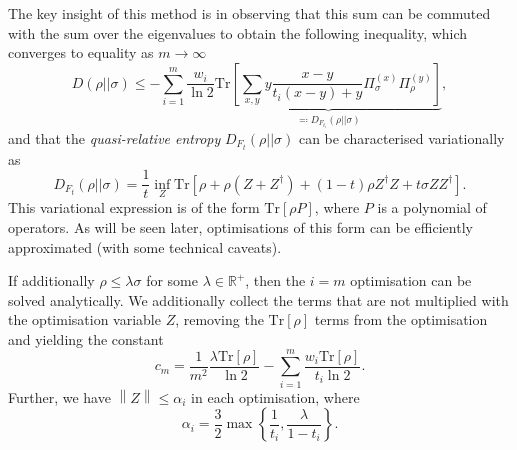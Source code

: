 \documentclass[10pt, a4paper]{article}
\numberwithin{equation}{section} %
\theoremstyle{definition}
\theoremstyle{plain}
\newcommand{\norm}[1]{\left\lVert#1\right\rVert}
\newcommand{\?}{\mathrel{?}} %
\newcommand{\R}{\mathbb{R}} %
\newcommand{\Tr}{\mathrm{Tr}} %
\begin{document}
      The key insight of this method is in observing that this sum can be commuted with the sum over the eigenvalues to obtain the following inequality, which converges to equality as \(m\to\infty\)
      \begin{equation}
        D(\rho||\sigma) \leq - \sum_{i=1}^{m} \frac{w_i}{\ln 2} \underbrace{\Tr\left[ \sum_{x,y} y \frac{x-y}{t_i(x-y)+y} \Pi^{(x)}_{\sigma} \Pi^{(y)}_{\rho} \right]}_{\eqqcolon D_{F_{t_i}}(\rho||\sigma)},\label{eqn:re_from_qre}
      \end{equation}
      and that the \emph{quasi-relative entropy} \(D_{F_{t}}(\rho||\sigma)\) can be characterised variationally as
      \begin{equation}
        D_{F_{t}}(\rho||\sigma) = \frac{1}{t} \inf_Z \Tr\left[ \rho + \rho(Z + Z^{\dagger}) + (1-t)\rho{}Z^{\dagger}Z + t\sigma{}ZZ^{\dagger} \right].\label{eqn:qre_var}
      \end{equation}
      This variational expression is of the form \(\Tr[\rho P]\), where \(P\) is a polynomial of operators. As will be seen later, optimisations of this form can be efficiently approximated (with some technical caveats).

      If additionally \(\rho \leq \lambda\sigma\) for some \(\lambda \in \R^+\), then the \(i=m\) optimisation can be solved analytically. We additionally collect the terms that are not multiplied with the optimisation variable \(Z\), removing the \(\Tr[\rho]\) terms from the optimisation and yielding the constant
      \begin{equation}
        c_m = \frac{1}{m^2} \frac{\lambda \Tr[\rho]}{\ln 2} - \sum_{i=1}^m \frac{w_i \Tr[\rho]}{t_i \ln 2}.
      \end{equation}
      Further, we have \(\norm{Z} \leq \alpha_i\) in each optimisation, where
      \begin{equation}\label{eqn:qre_bound}
        \alpha_i = \frac{3}{2} \max\left\{\frac{1}{t_i}, \frac{\lambda}{1-t_i}\right\}.
      \end{equation}
\end{document}
